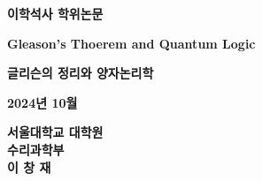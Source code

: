 \begin{titlepage}
    \begin{center}
    \huge
    \textbf{이학석사 학위논문}    
    \vspace*{2cm}
    
    \LARGE
    \textbf{Gleason's Thoerem and Quantum Logic}
    
    \vspace{1.0cm}
    \LARGE
    \textbf{글리슨의 정리와 양자논리학}
    
    \vspace{2.0cm}
    
    \textbf{2024년 10월}
    
    \vfill
    
    
    
    \Large

    \textbf{서울대학교 대학원}\\
    \textbf{수리과학부}\\
    \vspace{0.5cm}
    \textbf{이 창 재}
    
    \end{center}
\end{titlepage}


